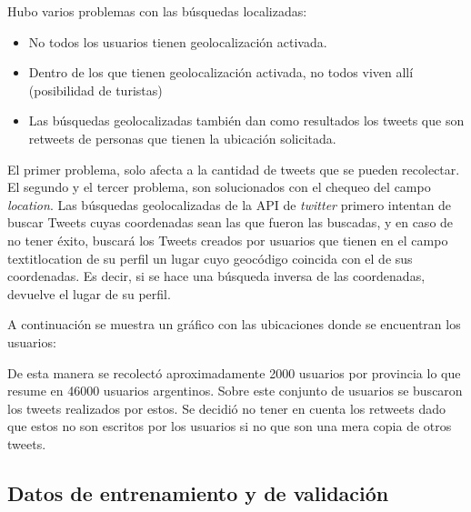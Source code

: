 Hubo varios problemas con las búsquedas localizadas:
\begin{itemize}
    \item No todos los usuarios tienen geolocalización activada.
    \item Dentro de los que tienen geolocalización activada, no todos viven allí (posibilidad de turistas)
    \item Las búsquedas geolocalizadas también dan como resultados los tweets que son retweets de personas que tienen la ubicación solicitada.
\end{itemize}
El primer problema, solo afecta a la cantidad de tweets que se pueden recolectar.
El segundo y el tercer problema, son solucionados con el chequeo del campo \textit{location}.
Las búsquedas geolocalizadas de la API de \textit{twitter} primero intentan de buscar Tweets cuyas coordenadas sean las que fueron las buscadas, y en caso de no tener éxito, buscará los Tweets creados por usuarios que tienen en el campo textit{location} de su perfil un lugar cuyo geocódigo coincida con el de sus coordenadas. Es decir, si se hace una búsqueda inversa de las coordenadas, devuelve el lugar de su perfil.  

A continuación se muestra un gráfico con las ubicaciones donde se encuentran los usuarios:



De esta manera se recolectó aproximadamente 2000 usuarios por provincia lo que resume en 46000 usuarios argentinos. Sobre este conjunto de usuarios se buscaron los tweets realizados por estos. Se decidió no tener en cuenta los retweets dado que estos no son escritos por los usuarios si no que son una mera copia de otros tweets. %

\subsection{Datos de entrenamiento y de validación}


